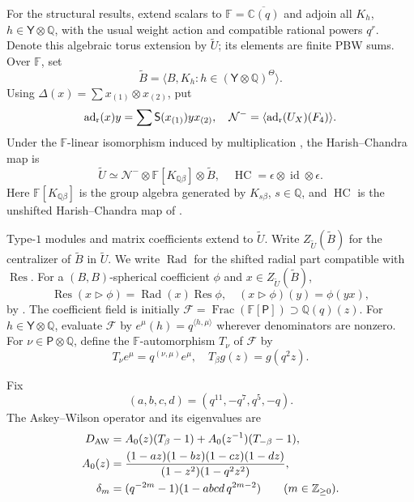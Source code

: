 \documentclass[12pt,reqno]{amsart}
\theoremstyle{plain}
\theoremstyle{definition}
\numberwithin{equation}{section}
\newcommand{\kk}{\mathbb Q(q)}
\newcommand{\Res}{\operatorname{Res}}
\newcommand{\Rad}{\operatorname{Rad}}
\newcommand{\HC}{\operatorname{HC}}
\newcommand{\eps}{\epsilon}
\newcommand{\tens}{\otimes}
\newcommand{\id}{\operatorname{id}}
\begin{document}
For the structural results, extend scalars to
$\mathbb F=\overline{\mathbb C(q)}$ and adjoin all $K_h$,
$h\in\mathsf Y\otimes\mathbb Q$, with the usual weight action
and compatible rational powers $q^r$.
Denote this algebraic torus extension by $\widetilde U$;
its elements are finite PBW sums. Over $\mathbb F$, set
\[
\widetilde B
=\langle B,K_h:h\in(\mathsf Y\otimes\mathbb Q)^\Theta\rangle.
\]
Using $\Delta(x)=\sum x_{(1)}\tens x_{(2)}$, put
\[
\operatorname{ad}_{\rm r}(x)y
=\sum\mathsf S(x_{(1)})yx_{(2)},\quad
\mathcal N^-=\langle\operatorname{ad}_{\rm r}(U_X)(F_4)\rangle.
\]
Under the $\mathbb F$-linear isomorphism induced by multiplication
\cite[proof of Lemma~4.8]{Sch26}, the Harish--Chandra map is
\begin{equation}\label{eq:HCdefinition}
	\widetilde U\simeq
	\mathcal N^-\tens\mathbb F[K_{\mathbb Q\beta}]
	\tens\widetilde B,\quad
	\HC=\eps\tens\id\tens\eps.
\end{equation}
Here $\mathbb F[K_{\mathbb Q\beta}]$ is the group algebra generated
by $K_{s\beta}$, $s\in\mathbb Q$, and $\HC$ is the unshifted
Harish--Chandra map of \cite[Definition~3.4]{Sch26}.

Type-$1$ modules and matrix coefficients extend to
$\widetilde U$. Write $Z_{\widetilde U}(\widetilde B)$ for the
centralizer of $\widetilde B$ in $\widetilde U$.
We write $\Rad$ for the shifted radial part compatible with $\Res$.
For a $(B,B)$-spherical coefficient $\phi$ and
$x\in Z_{\widetilde U}(\widetilde B)$,
\begin{equation}\label{eq:radialaction}
	\Res(x\triangleright\phi)=\Rad(x)\Res\phi,\quad
	(x\triangleright\phi)(y)=\phi(yx),
\end{equation}
by \cite[Definition~3.2 and Lemma~3.3]{Sch26}.
The coefficient field is initially
$\mathcal F=\operatorname{Frac}(\mathbb F[\mathsf P])\supset\kk(z)$.
For $h\in\mathsf Y\otimes\mathbb Q$, evaluate $\mathcal F$ by
$e^\mu(h)=q^{\langle h,\mu\rangle}$ wherever denominators are nonzero.
For $\nu\in\mathsf P\otimes\mathbb Q$, define the
$\mathbb F$-automorphism $T_\nu$ of $\mathcal F$ by
\[
T_\nu e^\mu=q^{(\nu,\mu)}e^\mu,\quad
T_\beta g(z)=g(q^2z).
\]

Fix
\begin{equation}\label{eq:AWparameters}
	(a,b,c,d)=(q^{11},-q^7,q^5,-q).
\end{equation}
The Askey--Wilson operator and its eigenvalues are
\begin{align}
	D_{\rm AW}
	&=A_0(z)(T_\beta-1)+A_0(z^{-1})(T_{-\beta}-1),
	\label{eq:DAW}\\
	A_0(z)
	&=\frac{(1-az)(1-bz)(1-cz)(1-dz)}
	{(1-z^2)(1-q^2z^2)},
	\label{eq:AWcoefficient}\\
	\delta_m
	&=(q^{-2m}-1)(1-abcd\,q^{2m-2})
	\qquad(m\in\mathbb Z_{\ge0}).
	\label{eq:AWeigenvalues}
\end{align}
\end{document}
